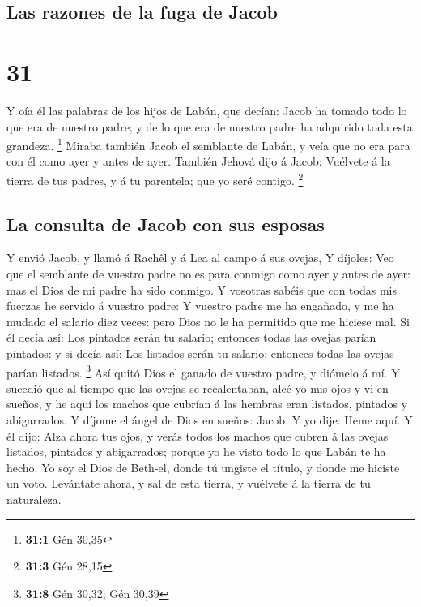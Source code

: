 \hypertarget{las-razones-de-la-fuga-de-jacob}{%
\subsection{Las razones de la fuga de
Jacob}\label{las-razones-de-la-fuga-de-jacob}}

\hypertarget{section-30}{%
\section{31}\label{section-30}}

 Y oía él las palabras de los hijos de Labán, que decían:
Jacob ha tomado todo lo que era de nuestro padre; y de lo que era de
nuestro padre ha adquirido toda esta grandeza. \footnote{\textbf{31:1}
  Gén 30,35}  Miraba también Jacob el semblante de Labán,
y veía que no era para con él como ayer y antes de ayer. 
También Jehová dijo á Jacob: Vuélvete á la tierra de tus padres, y á tu
parentela; que yo seré contigo. \footnote{\textbf{31:3} Gén 28,15}

\hypertarget{la-consulta-de-jacob-con-sus-esposas}{%
\subsection{La consulta de Jacob con sus
esposas}\label{la-consulta-de-jacob-con-sus-esposas}}

 Y envió Jacob, y llamó á Rachêl y á Lea al campo á sus
ovejas,  Y díjoles: Veo que el semblante de vuestro padre
no es para conmigo como ayer y antes de ayer: mas el Dios de mi padre ha
sido conmigo.  Y vosotras sabéis que con todas mis fuerzas
he servido á vuestro padre:  Y vuestro padre me ha
engañado, y me ha mudado el salario diez veces: pero Dios no le ha
permitido que me hiciese mal.  Si él decía así: Los
pintados serán tu salario; entonces todas las ovejas parían pintados: y
si decía así: Los listados serán tu salario; entonces todas las ovejas
parían listados. \footnote{\textbf{31:8} Gén 30,32; Gén 30,39}
 Así quitó Dios el ganado de vuestro padre, y diómelo á
mí.  Y sucedió que al tiempo que las ovejas se
recalentaban, alcé yo mis ojos y vi en sueños, y he aquí los machos que
cubrían á las hembras eran listados, pintados y abigarrados.
 Y díjome el ángel de Dios en sueños: Jacob. Y yo dije:
Heme aquí.  Y él dijo: Alza ahora tus ojos, y verás todos
los machos que cubren á las ovejas listados, pintados y abigarrados;
porque yo he visto todo lo que Labán te ha hecho.  Yo soy
el Dios de Beth-el, donde tú ungiste el título, y donde me hiciste un
voto. Levántate ahora, y sal de esta tierra, y vuélvete á la tierra de
tu naturaleza.


